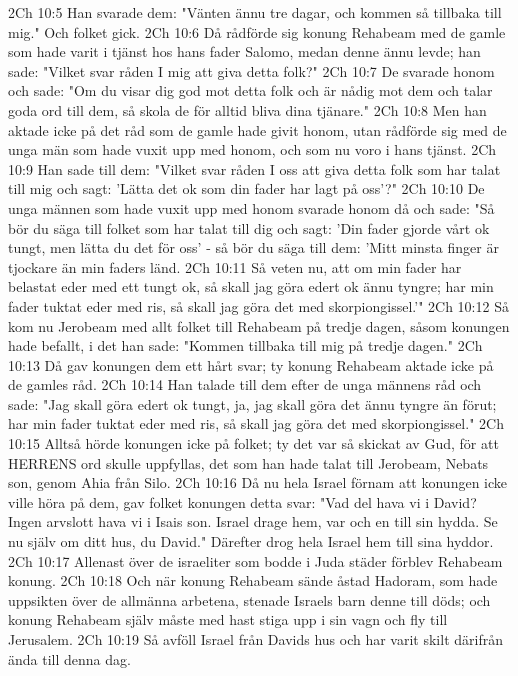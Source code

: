 2Ch 10:5  Han svarade dem: "Vänten ännu tre dagar, och kommen så tillbaka till mig." Och folket gick.
2Ch 10:6  Då rådförde sig konung Rehabeam med de gamle som hade varit i tjänst hos hans fader Salomo, medan denne ännu levde; han sade: "Vilket svar råden I mig att giva detta folk?"
2Ch 10:7  De svarade honom och sade: "Om du visar dig god mot detta folk och är nådig mot dem och talar goda ord till dem, så skola de för alltid bliva dina tjänare."
2Ch 10:8  Men han aktade icke på det råd som de gamle hade givit honom, utan rådförde sig med de unga män som hade vuxit upp med honom, och som nu voro i hans tjänst.
2Ch 10:9  Han sade till dem: "Vilket svar råden I oss att giva detta folk som har talat till mig och sagt: 'Lätta det ok som din fader har lagt på oss'?"
2Ch 10:10  De unga männen som hade vuxit upp med honom svarade honom då och sade: "Så bör du säga till folket som har talat till dig och sagt: 'Din fader gjorde vårt ok tungt, men lätta du det för oss' - så bör du säga till dem: 'Mitt minsta finger är tjockare än min faders länd.
2Ch 10:11  Så veten nu, att om min fader har belastat eder med ett tungt ok, så skall jag göra edert ok ännu tyngre; har min fader tuktat eder med ris, så skall jag göra det med skorpiongissel.'"
2Ch 10:12  Så kom nu Jerobeam med allt folket till Rehabeam på tredje dagen, såsom konungen hade befallt, i det han sade: "Kommen tillbaka till mig på tredje dagen."
2Ch 10:13  Då gav konungen dem ett hårt svar; ty konung Rehabeam aktade icke på de gamles råd.
2Ch 10:14  Han talade till dem efter de unga männens råd och sade: "Jag skall göra edert ok tungt, ja, jag skall göra det ännu tyngre än förut; har min fader tuktat eder med ris, så skall jag göra det med skorpiongissel."
2Ch 10:15  Alltså hörde konungen icke på folket; ty det var så skickat av Gud, för att HERRENS ord skulle uppfyllas, det som han hade talat till Jerobeam, Nebats son, genom Ahia från Silo.
2Ch 10:16  Då nu hela Israel förnam att konungen icke ville höra på dem, gav folket konungen detta svar: "Vad del hava vi i David? Ingen arvslott hava vi i Isais son. Israel drage hem, var och en till sin hydda. Se nu själv om ditt hus, du David." Därefter drog hela Israel hem till sina hyddor.
2Ch 10:17  Allenast över de israeliter som bodde i Juda städer förblev Rehabeam konung.
2Ch 10:18  Och när konung Rehabeam sände åstad Hadoram, som hade uppsikten över de allmänna arbetena, stenade Israels barn denne till döds; och konung Rehabeam själv måste med hast stiga upp i sin vagn och fly till Jerusalem.
2Ch 10:19  Så avföll Israel från Davids hus och har varit skilt därifrån ända till denna dag.
